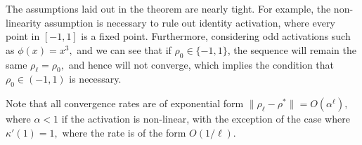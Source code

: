 \begin{remark}
The assumptions laid out in the theorem are nearly tight. For example, the non-linearity assumption is necessary to rule out identity activation, where every point in $[-1,1]$ is a fixed point. Furthermore, considering odd activations such as $\phi(x) = x^3,$ and we can see that if $\rho_0\in\{-1,1\}$, the sequence will remain the same $\rho_\ell=\rho_0,$ and hence will not converge, which implies the condition that $\rho_0\in(-1,1)$ is necessary. 
\end{remark}

\begin{remark}
Note that all convergence rates are of exponential form $\|\rho_\ell-\rho^*\|= O(\alpha^\ell),$ where $\alpha<1$ if the activation is non-linear, with the exception of the case where $\kappa'(1)=1,$ where the rate is of the form $O(1/\ell).$ 
\end{remark}

